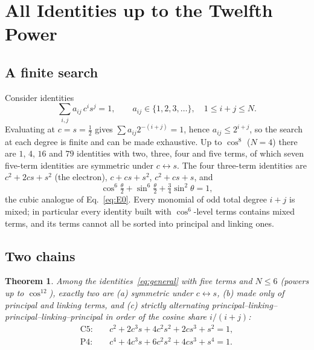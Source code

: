 \documentclass[%
 reprint, amsmath,amssymb, aps, prb, ]{revtex4-2}
\numberwithin{equation}{section}
\newtheorem{theorem}{Theorem}[section]
\begin{document}
\section{All Identities up to the Twelfth Power}
\label{sec:enum}

\subsection{A finite search}

Consider identities
\begin{equation}
\sum_{i,j}a_{ij}\,c^is^j=1,\qquad a_{ij}\in\{1,2,3,\dots\},\quad 1\le i+j\le N.
\label{eq:general}
\end{equation}
Evaluating at $c=s=\frac12$ gives $\sum a_{ij}2^{-(i+j)}=1$, hence $a_{ij}\le2^{i+j}$, so the search at each degree is finite and can be made exhaustive. Up to $\cos^8$ ($N=4$) there are $1$, $4$, $16$ and $79$ identities with two, three, four and five terms, of which seven five-term identities are symmetric under $c\leftrightarrow s$. The four three-term identities are $c^2+2cs+s^2$ (the electron), $c+cs+s^2$, $c^2+cs+s$, and
\begin{equation}
\cos^6\tfrac{\theta}{2}+\sin^6\tfrac{\theta}{2}+\tfrac34\sin^2\theta=1,
\label{eq:cubic}
\end{equation}
the cubic analogue of Eq.~\eqref{eq:E0}. Every monomial of odd total degree $i+j$ is mixed; in particular every identity built with $\cos^6$-level terms contains mixed terms, and its terms cannot all be sorted into principal and linking ones.

\subsection{Two chains}

\begin{theorem}
\label{thm:two}
Among the identities~\eqref{eq:general} with five terms and $N\le6$ (powers up to $\cos^{12}$), exactly two are (a) symmetric under $c\leftrightarrow s$, (b) made only of principal and linking terms, and (c) strictly alternating principal--linking--principal--linking--principal in order of the cosine share $i/(i+j)$:
\begin{align}
\mathrm{C5}:&\quad c^2+2c^3s+4c^2s^2+2cs^3+s^2=1,
\label{eq:C5}\\
\mathrm{P4}:&\quad c^4+4c^3s+6c^2s^2+4cs^3+s^4=1.
\label{eq:P4}
\end{align}
\end{theorem}
\end{document}
